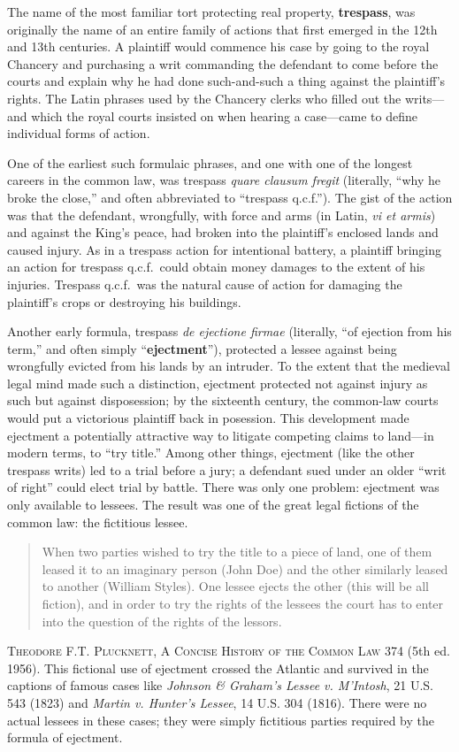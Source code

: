 The name of the most familiar tort protecting real property, \textbf{trespass},
was originally the name of an entire family of actions that first emerged in
the 12th and 13th centuries. A plaintiff would commence his case by going to
the royal Chancery and purchasing a writ commanding the defendant to come
before the courts and explain why he had done such-and-such a thing against the
plaintiff's rights. The Latin phrases used by the Chancery clerks who filled
out the writs---and which the royal courts insisted on when hearing a
case---came to define individual forms of action.

One of the earliest such formulaic phrases, and one with one of the longest
careers in the common law, was trespass \textit{quare clausum fregit}
(literally, ``why he broke the close,'' and often abbreviated to ``trespass
q.c.f.''). The gist of the action was that the defendant, wrongfully, with
force and arms (in Latin, \textit{vi et armis}) and against the King's peace,
had broken into the plaintiff's enclosed lands and caused injury. As in a
trespass action for intentional battery, a plaintiff bringing an action for
trespass q.c.f.\ could obtain money damages to the extent of his injuries.
Trespass q.c.f.\ was the natural cause of action for damaging the plaintiff's
crops or destroying his buildings.

Another early formula, trespass \textit{de ejectione firmae} (literally, ``of
ejection from his term,'' and often simply ``\textbf{ejectment}''), protected
a lessee against being wrongfully evicted from his lands by an intruder. To the
extent that the medieval legal mind made such a distinction, ejectment
protected not against injury as such but against disposession; by the sixteenth
century, the common-law courts would put a victorious plaintiff back in
posession. This development made ejectment a potentially attractive way to
litigate competing claims to land---in modern terms, to ``try title.'' Among
other things, ejectment (like the other trespass writs) led to a trial before a
jury; a defendant sued under an older ``writ of right'' could elect trial by
battle. There was only one problem: ejectment was only available to lessees.
The result was one of the great legal fictions of the common law: the
fictitious lessee.

\begin{quote}
When two parties wished to try the title to a piece of land, one of them leased
it to an imaginary person (John Doe) and the other similarly leased to another
(William Styles). One lessee ejects the other (this will be all fiction), and
in order to try the rights of the lessees the court has to enter into the
question of the rights of the lessors.
\end{quote}
\textsc{Theodore F.T. Plucknett, A Concise History of the Common Law} 374 (5th
ed. 1956). This fictional use of ejectment crossed the Atlantic and survived in
the captions of famous cases like \textit{Johnson \& Graham's Lessee v.
M'Intosh}, 21 U.S. 543 (1823) and \textit{Martin v. Hunter's Lessee}, 14 U.S.
304 (1816). There were no actual lessees in these cases; they were simply
fictitious parties required by the formula of ejectment.

